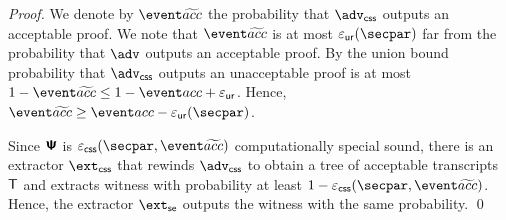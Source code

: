 \begin{proof}
	We denote by $\waccProb$ the probability that $\advcss$ outputs an acceptable proof. We note that $\waccProb$ is at most $\epsur (\secpar)$ far from the probability that $\advse$ outputs an acceptable proof. By the union bound probability that $\advcss$ outputs an unacceptable proof is at most $1 - \waccProb \leq 1 - \accProb + \epsur$. Hence, $\waccProb \geq \accProb - \epsur (\secpar)$. 

	Since $\bm{\mathsf{\Psi}}$ is $\epscss (\secpar, \waccProb)$ computationally special sound, there is an extractor $\extcss$ that rewinds $\advcss$ to obtain a tree of acceptable transcripts $\mathsf{T}$ and extracts witness with probability at least $1 - \epscss (\secpar, \waccProb)$. Hence, the extractor $\extse$ outputs the witness with the same probability.
	\qed
	\end{proof}

		

